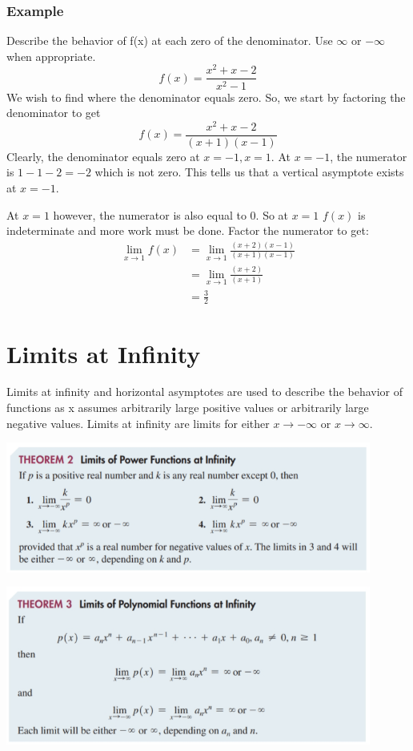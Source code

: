 \documentclass[14pt]{extarticle}
\begin{document}
\subsubsection{Example} Describe the behavior of f(x) at each zero of the denominator. Use $\infty$  or $-\infty$ when appropriate.
$$f(x) = \frac{x^2+x-2}{x^2-1}$$
We wish to find where the denominator equals zero. So, we start by factoring the denominator to get
$$f(x) = \frac{x^2+x-2}{(x+1)(x-1)}$$
Clearly, the denominator equals zero at $x=-1, x=1$. At $x=-1$, the numerator is $1-1-2=-2$ which is not zero. This tells us that a vertical asymptote exists at $x=-1$.

At $x=1$ however, the numerator is also equal to 0. So at $x=1$ $f(x)$ is indeterminate and more work must be done. Factor the numerator to get:
\begin{align*}
	\lim_{x\to 1}f(x) &=\lim_{x\to 1}\frac{(x+2)(x-1)}{(x+1)(x-1)} \\
	&=\lim_{x\to 1} \frac{(x+2)}{(x+1)} \\
	&= \frac{3}{2}
\end{align*}

\section{Limits at Infinity}
Limits at infinity and horizontal asymptotes are used to describe the behavior of functions as x assumes arbitrarily large positive values or arbitrarily large negative values. Limits at infinity are limits for either $x\to -\infty$ or $x\to \infty$.
\begin{center}
	\includegraphics[width=0.9\textwidth]{9-2-5}
\end{center}
\begin{center}
	\includegraphics[width=0.9\textwidth]{9-2-6}
\end{center}
\end{document}
